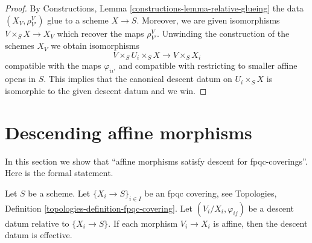 \begin{proof}
\medskip\noindent
By Constructions, Lemma \ref{constructions-lemma-relative-glueing} the data
$(X_V, \rho^V_{V'})$ glue to a scheme $X \to S$.
Moreover, we are given isomorphisms $V \times_S X \to X_V$
which recover the maps $\rho^V_{V'}$. Unwinding the construction
of the schemes $X_V$ we obtain isomorphisms
$$
V \times_S U_i \times_S X
\longrightarrow
V \times_S X_i
$$
compatible with the maps $\varphi_{ii'}$ and compatible with
restricting to smaller affine opens in $S$. This implies that
the canonical descent datum on $U_i \times_S X$ is isomorphic
to the given descent datum and we win.
\end{proof}










\section{Descending affine morphisms}
\label{section-affine}

\noindent
In this section we show that
``affine morphisms satisfy descent for fpqc-coverings''.
Here is the formal statement.

\begin{lemma}
\label{lemma-affine}
Let $S$ be a scheme.
Let $\{X_i \to S\}_{i\in I}$ be an fpqc covering, see
Topologies, Definition \ref{topologies-definition-fpqc-covering}.
Let $(V_i/X_i, \varphi_{ij})$ be a descent datum
relative to $\{X_i \to S\}$. If each morphism
$V_i \to X_i$ is affine, then the descent datum is
effective.
\end{lemma}


